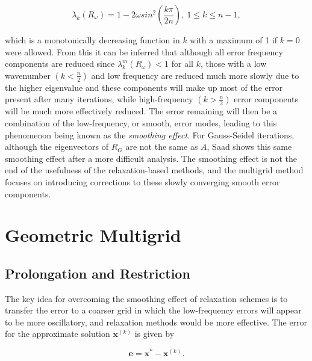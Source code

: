 \begin{equation}
	\lambda_k(R_{\omega}) = 1 - 2\omega sin^2\left(\frac{k\pi}{2n}\right),\ 1 \leq k \leq n-1,
\end{equation}

which is a monotonically decreasing function in $k$ with a maximum of 1 if $k = 0$ were allowed. From this it can be inferred that although all error frequency components are reduced since $\lambda_k^m(R_{\omega}) < 1$ for all $k$, those with a low wavenumber $\left(k < \frac{n}{2}\right)$ and low frequency are reduced much more slowly due to the higher eigenvalue and these components will make up most of the error present after many iterations, while high-frequency $\left(k > \frac{n}{2}\right)$ error components will be much more effectively reduced. The error remaining will then be a combination of the low-frequency, or smooth, error modes, leading to this phenomenon being known as the \emph{smoothing effect}. For Gauss-Seidel iterations, although the eigenvectors of $R_G$ are not the same as $A$, Saad shows this same smoothing effect after a more difficult analysis. The smoothing effect is not the end of the usefulness of the relaxation-based methods, and the multigrid method focuses on introducing corrections to these slowly converging smooth error components.


\section{Geometric Multigrid}

%

\subsection{Prolongation and Restriction}

The key idea for overcoming the smoothing effect of relaxation schemes is to transfer the error to a coarser grid in which the low-frequency errors will appear to be more oscillatory, and relaxation methods would be more effective. The error for the approximate solution $\mathbf{x}^{(k)}$ is given by

\begin{equation}
	\mathbf{e} = \mathbf{x}^* - \mathbf{x}^{(k)}.
\end{equation}

